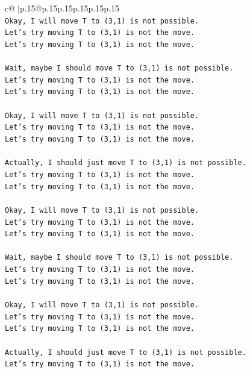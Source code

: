\documentclass{article}
\begin{document}
{\begin{supertabular}{c@{$\;$}|p{.15\linewidth}@{}p{.15\linewidth}p{.15\linewidth}p{.15\linewidth}p{.15\linewidth}p{.15\linewidth}}
{{{\\ 
\texttt{Okay, I will move T to (3,1) is not possible.} \\
\texttt{Let's try moving T to (3,1) is not the move.} \\
\texttt{Let's try moving T to (3,1) is not the move.} \\
\\ 
\texttt{Wait, maybe I should move T to (3,1) is not possible.} \\
\texttt{Let's try moving T to (3,1) is not the move.} \\
\texttt{Let's try moving T to (3,1) is not the move.} \\
\\ 
\texttt{Okay, I will move T to (3,1) is not possible.} \\
\texttt{Let's try moving T to (3,1) is not the move.} \\
\texttt{Let's try moving T to (3,1) is not the move.} \\
\\ 
\texttt{Actually, I should just move T to (3,1) is not possible.} \\
\texttt{Let's try moving T to (3,1) is not the move.} \\
\texttt{Let's try moving T to (3,1) is not the move.} \\
\\ 
\texttt{Okay, I will move T to (3,1) is not possible.} \\
\texttt{Let's try moving T to (3,1) is not the move.} \\
\texttt{Let's try moving T to (3,1) is not the move.} \\
\\ 
\texttt{Wait, maybe I should move T to (3,1) is not possible.} \\
\texttt{Let's try moving T to (3,1) is not the move.} \\
\texttt{Let's try moving T to (3,1) is not the move.} \\
\\ 
\texttt{Okay, I will move T to (3,1) is not possible.} \\
\texttt{Let's try moving T to (3,1) is not the move.} \\
\texttt{Let's try moving T to (3,1) is not the move.} \\
\\ 
\texttt{Actually, I should just move T to (3,1) is not possible.} \\
\texttt{Let's try moving T to (3,1) is not the move.} \\
}}}
\end{supertabular}}
\end{document}
